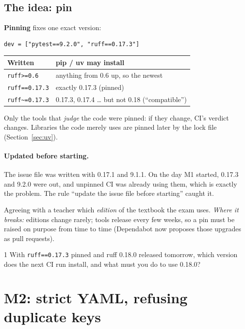 \documentclass[11pt,a4paper]{article}
\begin{document}
\subsection{The idea: pin}
\textbf{Pinning} fixes one exact version:
\begin{lstlisting}
dev = ["pytest==9.2.0", "ruff==0.17.3"]
\end{lstlisting}
\begin{center}
\begin{tabularx}{\textwidth}{l X}
\toprule
\textbf{Written} & \textbf{pip / uv may install} \\
\midrule
\texttt{ruff>=0.6} & anything from 0.6 up, so the newest \\
\texttt{ruff==0.17.3} & exactly 0.17.3 (pinned) \\
\texttt{ruff\textasciitilde=0.17.3} & 0.17.3, 0.17.4 \ldots{} but not 0.18 (``compatible'') \\
\bottomrule
\end{tabularx}
\end{center}
\noindent Only the tools that \emph{judge} the code were pinned: if they change, CI's verdict
changes. Libraries the code merely uses are pinned later by the lock file (Section~\ref{sec:uv}).

\paragraph{Updated before starting.} The issue file was written with 0.17.1 and 9.1.1. On the
day M1 started, 0.17.3 and 9.2.0 were out, and unpinned CI was already using them, which is
exactly the problem. The rule ``update the issue file before starting'' caught it.

\begin{analogy}
Agreeing with a teacher which \emph{edition} of the textbook the exam uses. \emph{Where it
breaks:} editions change rarely; tools release every few weeks, so a pin must be raised on
purpose from time to time (Dependabot now proposes those upgrades as pull requests).
\end{analogy}

\begin{quickcheck}{1}
With \texttt{ruff==0.17.3} pinned and ruff 0.18.0 released tomorrow, which version does the next
CI run install, and what must you do to use 0.18.0?
\end{quickcheck}

\section{M2: strict YAML, refusing duplicate keys}
\end{document}
